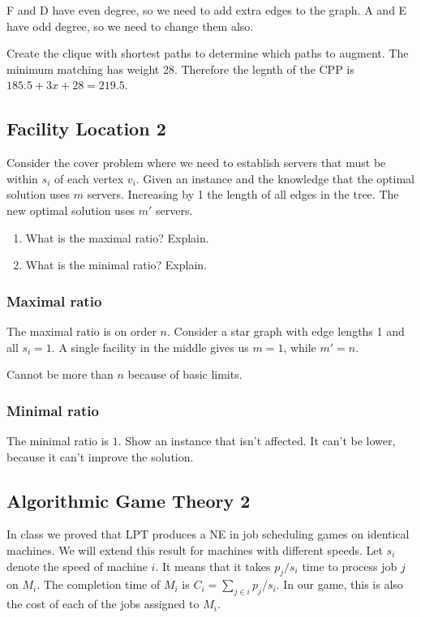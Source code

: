 \documentclass{idc_msc}
\begin{document}
F and D have even degree, so we need to add extra edges to the graph.
A and E have odd degree, so we need to change them also.

Create the clique with shortest paths to determine which paths to augment.
The minimum matching has weight 28.
Therefore the legnth of the CPP is \(185.5 + 3x + 28 = 219.5\).

\subsection{Facility Location 2}

Consider the cover problem where we need to establish servers that must be within \(s_i\) of each vertex \(v_i\).
Given an instance and the knowledge that the optimal solution uses \(m\) servers.
Increasing by 1 the length of all edges in the tree.
The new optimal solution uses \(m'\) servers.

\begin{enumerate}
  \item What is the maximal ratio? Explain.
  \item What is the minimal ratio? Explain.
\end{enumerate}

\subsubsection{Maximal ratio}

The maximal ratio is on order \(n\).
Consider a star graph with edge lengths 1 and all \(s_i=1\).
A single facility in the middle gives us \(m=1\), while \(m'=n\).

Cannot be more than \(n\) because of basic limits.

\subsubsection{Minimal ratio}

The minimal ratio is \(1\).
Show an instance that isn't affected.
It can't be lower, because it can't improve the solution.

\subsection{Algorithmic Game Theory 2}

In class we proved that LPT produces a NE in job scheduling games on identical machines.
We will extend this result for machines with different speeds.
Let \(s_i\) denote the speed of machine \(i\).
It means that it takes \(p_j/s_i\) time to process job \(j\) on \(M_i\).
The completion time of \(M_i\) is \(C_i=\sum_{j \in i} p_j/s_i\).
In our game, this is also the cost of each of the jobs assigned to \(M_i\).
\end{document}

